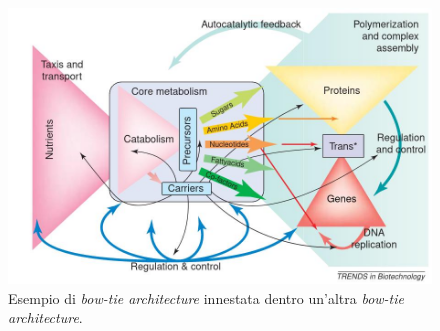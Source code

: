 \documentclass[a4paper,12pt, oneside]{book}
\begin{document}
\begin{figure}
  \centering
  \includegraphics[scale = 0.35]{img/rob8.jpg}
  \caption{Esempio di \textit{bow-tie architecture} innestata dentro un'altra
    \textit{bow-tie architecture}.} 
  \label{fig:bow}
\end{figure}
\end{document}
